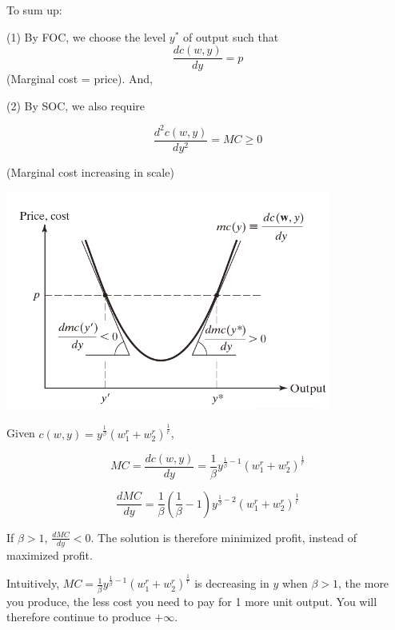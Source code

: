 \documentclass{article}
\begin{document}
\begin{mdframed}[backgroundcolor=blue!20,linecolor=white]
\vspace{3mm}

To sum up:


(1) By FOC, we choose the level $y^*$ of output such that 
$$\frac{dc(w,y)}{dy}= p$$
(Marginal cost = price). And,

(2) By SOC, we also require 

$$\frac{d^2c(w,y)}{dy^2} = MC \ge 0$$

(Marginal cost increasing in scale)


\vspace{2mm}
{\centering
\includegraphics[width=0.8\textwidth]{5.mc}
\label{fig:mc}}
\vspace{2mm}

\end{mdframed}

Given $c(w,y) = y^{\frac{1}{\beta}}{(w_1^r + w_2^r)^{\frac{1}{r}}} $,

$$MC=\frac{dc(w,y)}{dy}= \frac{1}{\beta}  y^{\frac{1}{\beta} - 1}{(w_1^r + w_2^r)^{\frac{1}{r}}}$$

$$\frac{d MC}{dy} = \frac{1}{\beta}(\frac{1}{\beta} - 1)  y^{\frac{1}{\beta} - 2}{(w_1^r + w_2^r)^{\frac{1}{r}}}$$


If $\beta >1$, $\frac{d MC}{dy} < 0$. The solution is therefore minimized profit, instead of maximized profit.

\begin{mdframed}[backgroundcolor=blue!20,linecolor=white]
Intuitively, $MC=\frac{1}{\beta}  y^{\frac{1}{\beta} - 1}{(w_1^r + w_2^r)^{\frac{1}{r}}}$ is decreasing in $y$ when $\beta > 1$, the more you produce, the less cost you need to pay for 1 more unit output. You will therefore continue to produce $+\infty$.

\end{mdframed}
\end{document}
